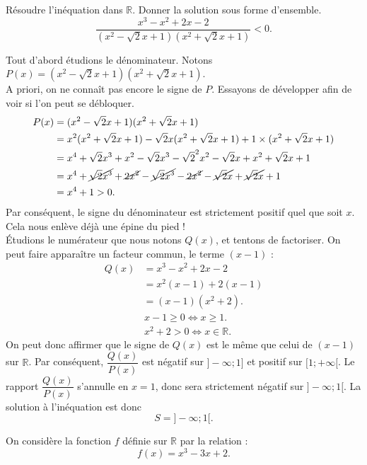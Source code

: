\documentclass[12pt,
addpoints,
fleqn
]{exam}
\begin{document}
\begin{questions}
\begin{solution}
\begin{parts}
\end{parts}
\end{solution}


\question Résoudre l'inéquation dans $\mathbb{R}$. Donner la solution sous forme d'ensemble.
\[ \dfrac{x^3-x^2+2x-2}{(x^2 - \sqrt{2}x+1)(x^2+\sqrt{2}x+1) } < 0.\]

\begin{solution}

Tout d'abord étudions le dénominateur. Notons $P(x)=(x^2-\sqrt{2}x +1)(x^2+\sqrt{2}x+1)$.\\
A priori, on ne connaît pas encore le signe de $P$. Essayons de développer afin de voir si l'on peut se débloquer.
\begin{align*}
P(x)&=(x^2-\sqrt{2}x +1)(x^2+\sqrt{2}x+1)\\
&= x^2(x^2 + \sqrt{2}x+1) -\sqrt{2}x(x^2+\sqrt{2}x+1) + 1\times(x^2 +\sqrt{2}x+1)\\
&= x^4 + \sqrt{2}x^3 + x^2 - \sqrt{2}x^3 - \sqrt{2}^2x^2 - \sqrt{2}x + x^2 + \sqrt{2}x +1\\
&= x^4 + \cancel{\sqrt{2}x^3} + \cancel{2x^2} - \cancel{\sqrt{2}x^3} - \cancel{2x^2} - \cancel{\sqrt{2}x} + \cancel{\sqrt{2}x} +1\\
&= x^4 +1 > 0.
\end{align*}
Par conséquent, le signe du dénominateur est strictement positif quel que soit $x$. Cela nous enlève déjà une épine du pied !\\
\'Etudions le numérateur que nous notons $Q(x)$, et tentons de factoriser. On peut faire apparaître un facteur commun, le terme $(x-1)$ :
\begin{align*}
Q(x)&= x^3-x^2 + 2x - 2 \\
&= x^2(x-1) + 2(x-1)\\
&= (x-1)(x^2 + 2).
\end{align*}
\begin{align*}
&x-1 \geq 0 \iff x\geq 1.\\
&x^2+2 > 0 \iff x\in\mathbb{R}.
\end{align*}
On peut donc affirmer que le signe de $Q(x)$ est le même que celui de $(x-1)$ sur $\mathbb{R}$. Par conséquent, $\dfrac{Q(x)}{P(x)}$ est négatif sur $]-\infty;1]$ et positif sur $[1;+\infty[$. Le rapport $\dfrac{Q(x)}{P(x)}$ s'annulle en $x=1$, donc sera strictement négatif sur $]-\infty ; 1[$.
La solution à l'inéquation est donc 
\[
\boxed{S=]-\infty ; 1[}.
\]
\end{solution}

\question On considère la fonction $f$ définie sur $\mathbb{R}$ par la relation : 
\[ f(x)= x^3 - 3x +2. \]
\begin{parts}

\end{parts}
\end{questions}
\end{document}
